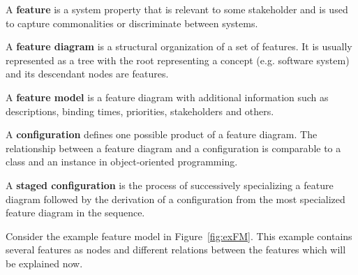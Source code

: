 \begin{definition}
A \textbf{feature} is a system property that is relevant to some stakeholder and is used to capture commonalities or discriminate between systems.
\end{definition}

\begin{definition}
A \textbf{feature diagram} is a structural organization of a set of features. It is usually represented as a tree with the root representing a concept (e.g. software system) and its descendant nodes are features.
\end{definition}


\begin{definition}
A \textbf{feature model} is a feature diagram with additional information such as descriptions, binding times, priorities, stakeholders and others.
\end{definition}

\begin{definition}
 A \textbf{configuration} defines one possible product of a feature diagram. The relationship between a feature diagram and a configuration is comparable to a class and an instance in object-oriented programming.
\end{definition}


\begin{definition}
 A \textbf{staged configuration} is the process of successively specializing a feature diagram followed by the derivation of a configuration from the most specialized feature diagram in the sequence.
\end{definition}

Consider the example feature model in Figure~\ref{fig:exFM}. This example contains several features as nodes and different relations between the features which will be explained now.


